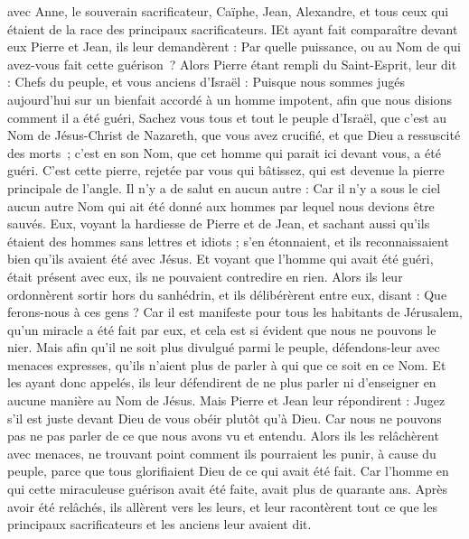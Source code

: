 \begin{multicols}{2}
avec Anne, le souverain sacrificateur, Caïphe, Jean, Alexandre, et tous ceux qui étaient de la race des principaux sacrificateurs.
IEt ayant fait comparaître devant eux Pierre et Jean, ils leur demandèrent : Par quelle puissance, ou au Nom de qui avez-vous fait cette guérison ?
Alors Pierre étant rempli du Saint-Esprit, leur dit : Chefs du peuple, et vous anciens d'Israël :
Puisque nous sommes jugés aujourd'hui sur un bienfait accordé à un homme impotent, afin que nous disions comment il a été guéri,
Sachez vous tous et tout le peuple d’Israël, que c'est  au Nom de Jésus-Christ de Nazareth, que vous avez crucifié, et que Dieu a ressuscité des morts ; c’est en son Nom, que cet homme qui parait ici devant vous, a été guéri.
C’est cette pierre, rejetée par vous qui bâtissez, qui est devenue la pierre principale de l'angle.
Il n'y a de salut en aucun autre : Car il n'y a sous le ciel aucun autre Nom qui ait été donné aux hommes par lequel nous devions être sauvés.
Eux, voyant la hardiesse de Pierre et de Jean, et sachant aussi qu'ils étaient des hommes sans lettres et idiots ; s'en étonnaient, et ils reconnaissaient bien qu'ils avaient été avec Jésus.
Et voyant que l'homme qui avait été guéri, était présent avec eux, ils ne pouvaient contredire en rien.
Alors ils leur ordonnèrent sortir hors du sanhédrin, et ils délibérèrent entre eux, disant : Que ferons-nous à ces gens ?
Car il est manifeste pour tous les habitants de Jérusalem, qu'un miracle a été fait par eux, et cela est si évident que nous ne pouvons le nier.
Mais afin qu'il ne soit plus divulgué parmi le peuple, défendons-leur avec menaces expresses, qu'ils n'aient plus de parler à qui que ce soit en ce Nom.
Et les ayant donc appelés, ils leur défendirent de ne plus parler ni d’enseigner en aucune manière au Nom de Jésus.
Mais Pierre et Jean leur répondirent : Jugez s'il est juste devant Dieu de vous obéir plutôt qu'à Dieu.
Car nous ne pouvons pas ne pas parler de ce que nous avons vu et entendu.
Alors ils les relâchèrent avec menaces, ne trouvant point comment ils pourraient les punir, à cause du peuple, parce que tous glorifiaient Dieu de ce qui avait été fait.
Car l'homme en qui cette miraculeuse guérison avait été faite, avait plus de quarante ans.
Après avoir été relâchés, ils allèrent vers les leurs, et leur racontèrent tout ce que les principaux sacrificateurs et les anciens leur avaient dit.

\end{multicols}
